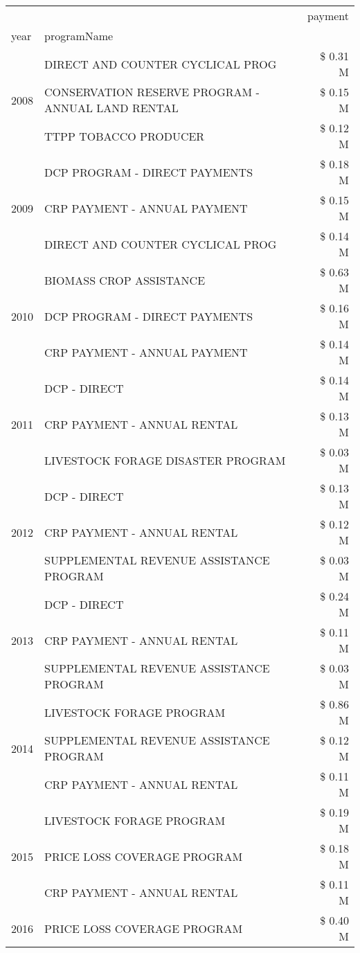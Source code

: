 \begin{tabular}{llr}
\toprule
 &  & payment \\
year & programName &  \\
\midrule
\multirow[t]{3}{*}{2008} & DIRECT AND COUNTER CYCLICAL PROG & \$ 0.31 M \\
 & CONSERVATION RESERVE PROGRAM - ANNUAL LAND RENTAL & \$ 0.15 M \\
 & TTPP TOBACCO PRODUCER & \$ 0.12 M \\
\cline{1-3}
\multirow[t]{3}{*}{2009} & DCP PROGRAM - DIRECT PAYMENTS & \$ 0.18 M \\
 & CRP PAYMENT - ANNUAL PAYMENT & \$ 0.15 M \\
 & DIRECT AND COUNTER CYCLICAL PROG & \$ 0.14 M \\
\cline{1-3}
\multirow[t]{3}{*}{2010} & BIOMASS CROP ASSISTANCE & \$ 0.63 M \\
 & DCP PROGRAM - DIRECT PAYMENTS & \$ 0.16 M \\
 & CRP PAYMENT - ANNUAL PAYMENT & \$ 0.14 M \\
\cline{1-3}
\multirow[t]{3}{*}{2011} & DCP - DIRECT & \$ 0.14 M \\
 & CRP PAYMENT - ANNUAL RENTAL & \$ 0.13 M \\
 & LIVESTOCK FORAGE DISASTER PROGRAM & \$ 0.03 M \\
\cline{1-3}
\multirow[t]{3}{*}{2012} & DCP - DIRECT & \$ 0.13 M \\
 & CRP PAYMENT - ANNUAL RENTAL & \$ 0.12 M \\
 & SUPPLEMENTAL REVENUE ASSISTANCE PROGRAM & \$ 0.03 M \\
\cline{1-3}
\multirow[t]{3}{*}{2013} & DCP - DIRECT & \$ 0.24 M \\
 & CRP PAYMENT - ANNUAL RENTAL & \$ 0.11 M \\
 & SUPPLEMENTAL REVENUE ASSISTANCE PROGRAM & \$ 0.03 M \\
\cline{1-3}
\multirow[t]{3}{*}{2014} & LIVESTOCK FORAGE PROGRAM & \$ 0.86 M \\
 & SUPPLEMENTAL REVENUE ASSISTANCE PROGRAM & \$ 0.12 M \\
 & CRP PAYMENT - ANNUAL RENTAL & \$ 0.11 M \\
\cline{1-3}
\multirow[t]{3}{*}{2015} & LIVESTOCK FORAGE PROGRAM & \$ 0.19 M \\
 & PRICE LOSS COVERAGE PROGRAM & \$ 0.18 M \\
 & CRP PAYMENT - ANNUAL RENTAL & \$ 0.11 M \\
\cline{1-3}
\multirow[t]{3}{*}{2016} & PRICE LOSS COVERAGE PROGRAM                   & \$ 0.40 M \\

\end{tabular}
